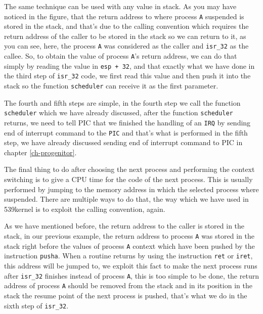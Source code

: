The same technique can be used with any value in stack. As you may have
noticed in the figure, that the return address to where process
\lstinline!A! suspended is stored in the stack, and that's due to the
calling convention which requires the return address of the caller to be
stored in the stack so we can return to it, as you can see, here, the
process \lstinline!A! was considered as the caller and
\lstinline!isr_32! as the callee. So, to obtain the value of process
\lstinline!A!'s return address, we can do that simply by reading the
value in \lstinline!esp + 32!, and that exactly what we have done in the
third step of \lstinline!isr_32! code, we first read this value and then
push it into the stack so the function \lstinline!scheduler! can receive
it as the first parameter.

The fourth and fifth steps are simple, in the fourth step we call the
function \lstinline!scheduler! which we have already discussed, after
the function \lstinline!scheduler! returns, we need to tell PIC that we
finished the handling of an \lstinline!IRQ! by sending end of interrupt
command to the \lstinline!PIC! and that's what is performed in the fifth
step, we have already discussed sending end of interrupt command to PIC
in chapter \ref{ch-progenitor}.

The final thing to do after choosing the next process and performing the
context switching is to give a CPU time for the code of the next
process. This is usually performed by jumping to the memory address in
which the selected process where suspended. There are multiple ways to
do that, the way which we have used in 539kernel is to exploit the
calling convention, again.

As we have mentioned before, the return address to the caller is stored
in the stack, in our previous example, the return address to process
\lstinline!A! was stored in the stack right before the values of process
\lstinline!A! context which have been pushed by the instruction
\lstinline!pusha!. When a routine returns by using the instruction
\lstinline!ret! or \lstinline!iret!, this address will be jumped to, we
exploit this fact to make the next process runs after \lstinline!isr_32!
finishes instead of process \lstinline!A!, this is too simple to be
done, the return address of process \lstinline!A! should be removed from
the stack and in its position in the stack the resume point of the next
process is pushed, that's what we do in the sixth step of
\lstinline!isr_32!.

